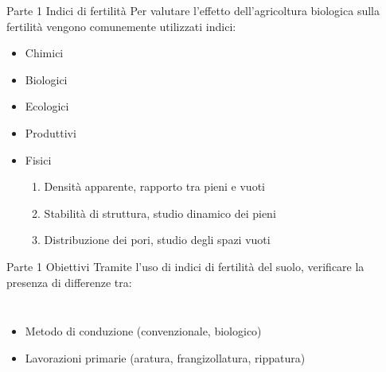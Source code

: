 \documentclass[10pt]{beamer}
\begin{document}
\begin{frame}{Parte 1 \small{Indici di fertilità}}
  Per valutare l'effetto dell'agricoltura biologica sulla fertilità
  vengono comunemente utilizzati indici:
  \begin{itemize}[<+->]
    \pause
  \item Chimici
  \item Biologici
  \item Ecologici
  \item Produttivi
  \item \LARGE Fisici

    \begin{enumerate}[<+->]

    \item  \large{Densità apparente}, \normalsize{rapporto tra pieni e vuoti}
      \vfill
    \item  \large{Stabilità di struttura}, \normalsize{studio dinamico dei pieni}
      \vfill
    \item  \large{Distribuzione dei pori}, \normalsize{studio degli spazi vuoti}
    \end{enumerate}
  \end{itemize}
  
\end{frame}



\begin{frame}{Parte 1 \small{Obiettivi}}
  Tramite l'uso di indici di fertilità del suolo, verificare la
  presenza di differenze tra:
  \begin{columns}[c]
    \begin{itemize}[<+->]
      \pause
    \item Metodo di conduzione (convenzionale, biologico) 

    \item Lavorazioni primarie (aratura, frangizollatura, rippatura)
    \end{itemize}
  \end{columns}
\end{frame}
\end{document}

